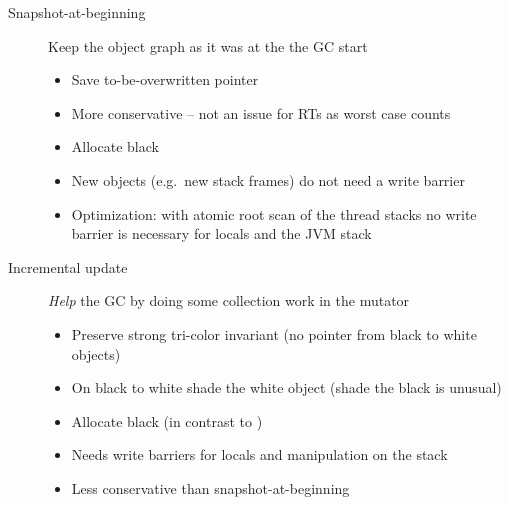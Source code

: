 \begin{description}
    \item[Snapshot-at-beginning] Keep the object graph as it was at
    the the GC start
    \begin{itemize}
        \item Save to-be-overwritten pointer
        \item More conservative -- not an issue for RTs as worst case
        counts
        \item Allocate black
        \item New objects (e.g.\ new stack frames) do not need a
        write barrier
        \item Optimization: with atomic root scan of the thread
        stacks no write barrier is necessary for locals and the JVM
        stack
    \end{itemize}
    \item[Incremental update] \emph{Help} the GC by doing some collection
    work in the mutator
    \begin{itemize}
        \item Preserve strong tri-color invariant (no pointer from
        black to white objects)
        \item On black to white shade the white object (shade the
        black is unusual)
        \item Allocate black (in contrast to \cite{gc:dijkstra78})
        \item Needs write barriers for locals and manipulation on
        the stack
        \item Less conservative than snapshot-at-beginning
    \end{itemize}
\end{description}

